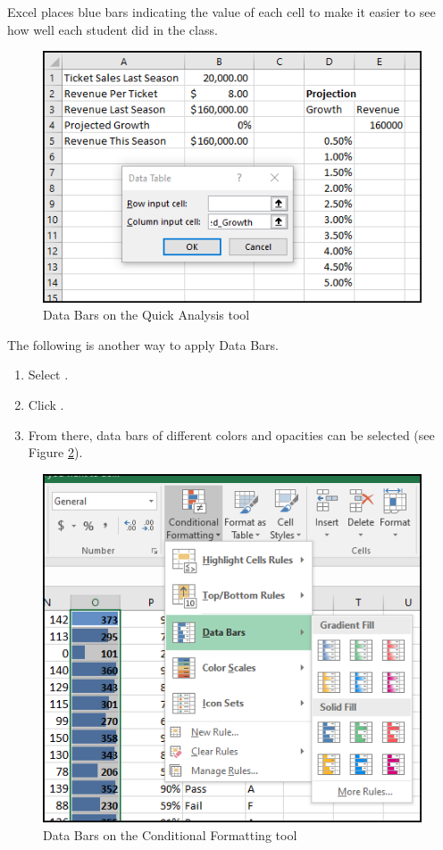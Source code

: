 Excel places blue bars indicating the value of each cell to make it easier to see how well each student did in the class.

\begin{figure}[H]
	\centering
	\includegraphics[width=\maxwidth{.95\linewidth}]{gfx/ch03_fig18}
	\caption{Data Bars on the Quick Analysis tool}
	\label{03:fig18}
\end{figure}

The following is another way to apply Data Bars.

\begin{enumbox}
	\begin{enumerate}
		\item Select .
		\item Click . 	
		\item From there, data bars of different colors and opacities can be selected (see Figure \ref{03:fig19}).
	\end{enumerate}
\end{enumbox}
	
\begin{figure}[H]
	\centering
	\includegraphics[width=\maxwidth{.95\linewidth}]{gfx/ch03_fig19}
	\caption{Data Bars on the Conditional Formatting tool}
	\label{03:fig19}
\end{figure}

